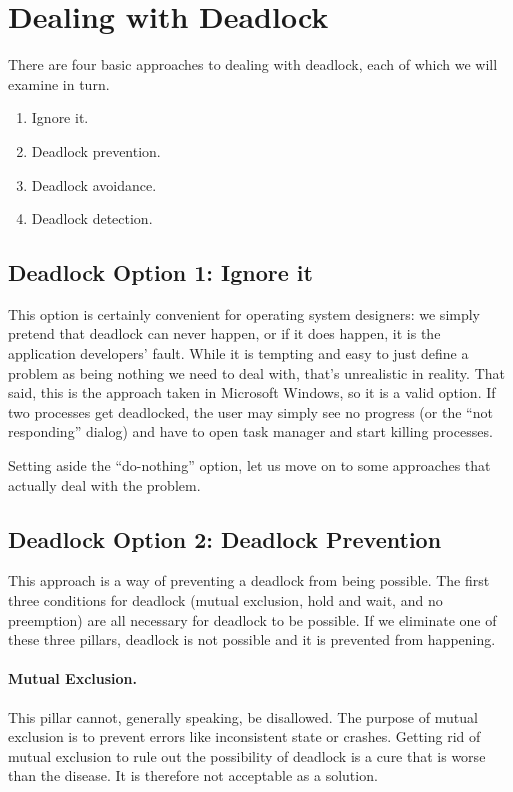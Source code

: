 \section*{Dealing with Deadlock}

There are four basic approaches to dealing with deadlock, each of which we will examine in turn.
\begin{enumerate}
	\item Ignore it.
	\item Deadlock prevention.
	\item Deadlock avoidance.
	\item Deadlock detection.
\end{enumerate}

\subsection*{Deadlock Option 1: Ignore it}
This option is certainly convenient for operating system designers: we simply pretend that deadlock can never happen, or if it does happen, it is the application developers' fault. While it is tempting and easy to just define a problem as being nothing we need to deal with, that's unrealistic in reality. That said, this is the approach taken in Microsoft Windows, so it is a valid option. If two processes get deadlocked, the user may simply see no progress (or the ``not responding'' dialog) and have to open task manager and start killing processes.

Setting aside the ``do-nothing'' option, let us move on to some approaches that actually deal with the problem.

\subsection*{Deadlock Option 2: Deadlock Prevention}

This approach is a way of preventing a deadlock from being possible. The first three conditions for deadlock (mutual exclusion, hold and wait, and no preemption) are all necessary for deadlock to be possible. If we eliminate one of these three pillars, deadlock is not possible and it is prevented from happening.

\paragraph{Mutual Exclusion.} This pillar cannot, generally speaking, be disallowed. The purpose of  mutual exclusion is to prevent errors like inconsistent state or crashes. Getting rid of mutual exclusion to rule out the possibility of deadlock is a cure that is worse than the disease. It is therefore not acceptable as a solution.

